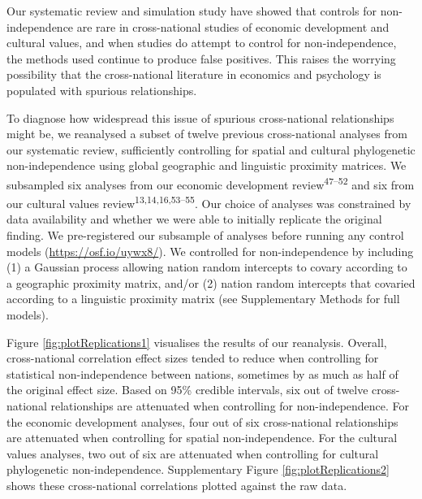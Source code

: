 \documentclass[
  english,
  man,floatsintext]{apa6}
\begin{document}
Our systematic review and simulation study have showed that controls for non-independence are rare in cross-national studies of economic development and cultural values, and when studies do attempt to control for non-independence, the methods used continue to produce false positives. This raises the worrying possibility that the cross-national literature in economics and psychology is populated with spurious relationships.

To diagnose how widespread this issue of spurious cross-national relationships might be, we reanalysed a subset of twelve previous cross-national analyses from our systematic review, sufficiently controlling for spatial and cultural phylogenetic non-independence using global geographic and linguistic proximity matrices. We subsampled six analyses from our economic development review\textsuperscript{47--52} and six from our cultural values review\textsuperscript{13,14,16,53--55}. Our choice of analyses was constrained by data availability and whether we were able to initially replicate the original finding. We pre-registered our subsample of analyses before running any control models (\url{https://osf.io/uywx8/}). We controlled for non-independence by including (1) a Gaussian process allowing nation random intercepts to covary according to a geographic proximity matrix, and/or (2) nation random intercepts that covaried according to a linguistic proximity matrix (see Supplementary Methods for full models).

Figure \ref{fig:plotReplications1} visualises the results of our reanalysis. Overall, cross-national correlation effect sizes tended to reduce when controlling for statistical non-independence between nations, sometimes by as much as half of the original effect size. Based on 95\% credible intervals, six out of twelve cross-national relationships are attenuated when controlling for non-independence. For the economic development analyses, four out of six cross-national relationships are attenuated when controlling for spatial non-independence. For the cultural values analyses, two out of six are attenuated when controlling for cultural phylogenetic non-independence. Supplementary Figure \ref{fig:plotReplications2} shows these cross-national correlations plotted against the raw data.
\end{document}
